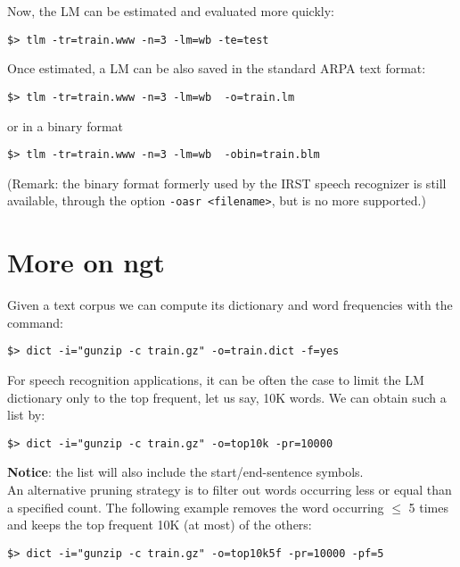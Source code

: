 \documentclass[11pt]{article}
\begin{document}
\noindent
Now,  the  LM can  be  estimated and evaluated more quickly:
\begin{verbatim}
$> tlm -tr=train.www -n=3 -lm=wb -te=test
\end{verbatim}

\noindent
Once  estimated, a  LM can  be also saved in the standard ARPA text format:
\begin{verbatim}
$> tlm -tr=train.www -n=3 -lm=wb  -o=train.lm
\end{verbatim}
or in a binary format 
\begin{verbatim}
$> tlm -tr=train.www -n=3 -lm=wb  -obin=train.blm
\end{verbatim}

\noindent
(Remark: the  binary format formerly used by the IRST speech recognizer is still available, through the option
{\tt -oasr <filename>}, but is no more supported.)

\newpage
\section{More on ngt}
Given a text corpus we can compute its dictionary and word frequencies
with the command:

\begin{verbatim}
$> dict -i="gunzip -c train.gz" -o=train.dict -f=yes
\end{verbatim}

\noindent
For speech recognition applications, it  can be often the case to limit the LM dictionary  only to the top frequent, let us say,
10K words. We can obtain such a list by:
\begin{verbatim}
$> dict -i="gunzip -c train.gz" -o=top10k -pr=10000
\end{verbatim}


\noindent
{\bf Notice}: the list will also include the start/end-sentence symbols.\\

\noindent
An alternative pruning strategy is to filter out words occurring less or equal than a specified 
count. The following example removes the word occurring $\le$ 5 times and keeps
the top frequent 10K (at most) of the others:
\begin{verbatim}
$> dict -i="gunzip -c train.gz" -o=top10k5f -pr=10000 -pf=5
\end{verbatim}
\end{document}
